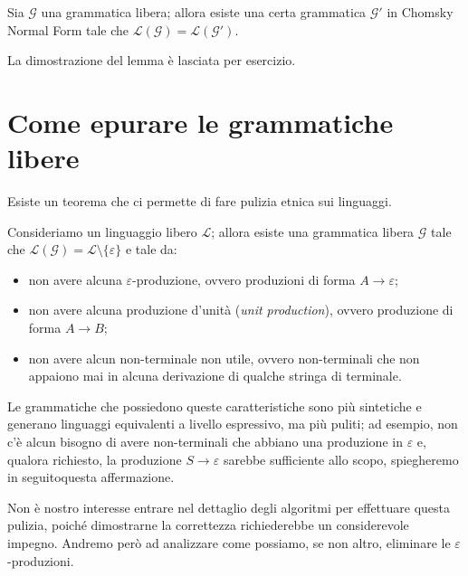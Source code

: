 \documentclass[class=book, crop=false, oneside, 12pt]{standalone}
\begin{document}
\begin{lemma}
  Sia \(\mathcal{G}\) una grammatica libera; allora esiste una certa grammatica \(\mathcal{G'}\) in Chomsky Normal Form tale che \(\mathcal{L(G)} = \mathcal{L(G')}\).
\end{lemma}

\noindent La dimostrazione del lemma è lasciata per esercizio.

\section{Come epurare le grammatiche libere}
Esiste un teorema che ci permette di fare pulizia etnica sui linguaggi.
\begin{theorem}
  Consideriamo un linguaggio libero \(\mathcal{L}\); allora esiste una grammatica libera \(\mathcal{G}\) tale che \(\mathcal{L(G)} = \mathcal{L} \setminus \{ \varepsilon \}\) e tale da:
  \begin{itemize}
    \item non avere alcuna \(\varepsilon\)-produzione, ovvero produzioni di forma \(A \rightarrow \varepsilon\);
    \item non avere alcuna produzione d'unità (\emph{unit production}), ovvero produzione di forma \(A \rightarrow B\);
    \item non avere alcun non-terminale non utile, ovvero non-terminali che non appaiono mai in alcuna derivazione di qualche stringa di terminale.
  \end{itemize}
\end{theorem}

Le grammatiche che possiedono queste caratteristiche sono più sintetiche e generano linguaggi equivalenti a livello espressivo, ma più puliti; ad esempio, non c'è alcun bisogno di avere non-terminali che abbiano una produzione in \(\varepsilon\) e, qualora richiesto, la produzione \(S \rightarrow \varepsilon\) sarebbe sufficiente allo scopo, spiegheremo in seguitoquesta affermazione.

Non è nostro interesse entrare nel dettaglio degli algoritmi per effettuare questa pulizia, poiché dimostrarne la correttezza richiederebbe un considerevole impegno. Andremo però ad analizzare come possiamo, se non altro,  eliminare le \(\varepsilon\)-produzioni.
\end{document}
